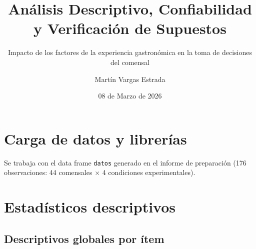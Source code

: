 \documentclass[
  spanish,
]{article}
\title{Análisis Descriptivo, Confiabilidad y Verificación de Supuestos}
\subtitle{Impacto de los factores de la experiencia gastronómica en la
toma de decisiones del comensal}
\author{Martín Vargas Estrada}
\date{08 de Marzo de 2026}
\begin{document}
\maketitle

{
\setcounter{tocdepth}{3}
\tableofcontents
}
\section{Carga de datos y
librerías}\label{carga-de-datos-y-libreruxedas}

Se trabaja con el data frame \texttt{datos} generado en el informe de
preparación (176 observaciones: 44 comensales \(\times\) 4 condiciones
experimentales).

\section{Estadísticos descriptivos}\label{estaduxedsticos-descriptivos}

\subsection{Descriptivos globales por
ítem}\label{descriptivos-globales-por-uxedtem}
\end{document}

